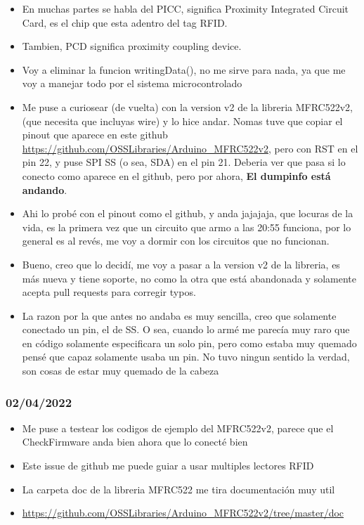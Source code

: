 \documentclass[../informe_krapp.tex]{subfiles}
\begin{document}
\begin{itemize}
	\item En muchas partes se habla del PICC, significa
	      Proximity Integrated Circuit Card, es el chip que esta adentro del tag RFID.

	\item Tambien, PCD significa proximity coupling device.

	\item Voy a eliminar la funcion writingData(), no me sirve para nada, ya que
	      me voy a manejar todo por el sistema microcontrolado

	\item Me puse a curiosear (de vuelta) con la version v2 de la libreria
	      MFRC522v2, (que necesita que incluyas wire)
	      y lo hice andar. Nomas tuve que copiar el pinout que aparece en este github
	      \url{https://github.com/OSSLibraries/Arduino_MFRC522v2}, pero con RST en el
	      pin 22, y puse SPI SS (o sea, SDA) en el pin 21. Deberia ver que pasa si
	      lo conecto como aparece en el github, pero por ahora,
	      \textbf{El dumpinfo está andando}.

	\item Ahi lo probé con el pinout como el github,
	      y anda jajajaja, que locuras de la vida,
	      es la primera vez que un circuito que armo a las 20:55 funciona,
	      por lo general es al revés, me voy a dormir con los circuitos que no funcionan.

	\item Bueno, creo que lo decidí, me voy a pasar a la version v2 de la libreria,
	      es más nueva y tiene soporte, no como la otra que está abandonada y solamente
	      acepta pull requests para corregir typos.

	\item La razon por la que antes no andaba es muy sencilla, creo que solamente
	      conectado un pin, el de SS. O sea, cuando lo armé me parecía muy raro que en código
	      solamente especificara un solo pin, pero como estaba muy quemado pensé que capaz
	      solamente usaba un pin. No tuvo ningun sentido la verdad, son cosas de estar muy
	      quemado de la cabeza



\end{itemize}
\subsubsection{02/04/2022}
\begin{itemize}
	\item Me puse a testear los codigos de ejemplo del MFRC522v2, parece que el
	      CheckFirmware anda bien ahora que lo conecté bien
	\item Este issue de github me puede guiar a usar multiples lectores RFID
	\item La carpeta doc de la libreria MFRC522 me tira documentación muy util
	\item \url{https://github.com/OSSLibraries/Arduino_MFRC522v2/tree/master/doc}
\end{itemize}
\end{document}
